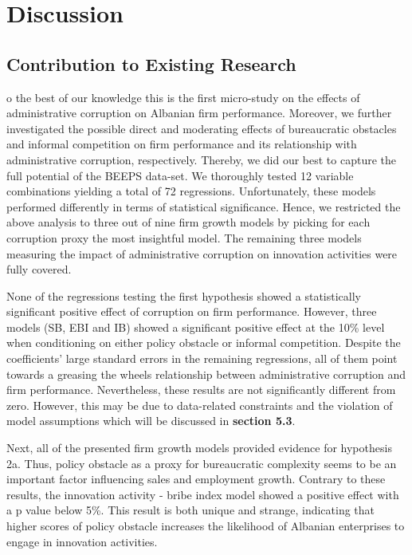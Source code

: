 %
%
\let\textcircled=\pgftextcircled
\chapter{Discussion}
\label{chap:intro}

\section{Contribution to Existing Research}
o the best of our knowledge this is the first micro-study on the effects of administrative corruption on Albanian firm performance. Moreover, we further investigated the possible direct and moderating effects of bureaucratic obstacles and informal competition on firm performance and its relationship with administrative corruption, respectively. Thereby, we did our best to capture the full potential of the BEEPS data-set. We thoroughly tested 12 variable combinations yielding a total of 72 regressions. Unfortunately, these models performed differently in terms of statistical significance. Hence, we restricted the above analysis to three out of nine firm growth models by picking for each corruption proxy the most insightful model. The remaining three models measuring the impact of administrative corruption on innovation activities were fully covered.

None of the regressions testing the first hypothesis showed a statistically significant positive effect of corruption on firm performance. However, three models (SB, EBI and IB) showed a significant positive effect at the 10\% level when conditioning on either policy obstacle or informal competition. Despite the coefficients' large standard errors in the remaining regressions, all of them point towards a greasing the wheels relationship between administrative corruption and firm performance. Nevertheless, these results are not significantly different from zero. However, this may be due to data-related constraints and the violation of model assumptions which will be discussed in \textbf{section 5.3}. 

Next, all of the presented firm growth models provided evidence for hypothesis 2a. Thus, policy obstacle as a proxy for bureaucratic complexity seems to be an important factor influencing sales and employment growth. Contrary to these results, the innovation activity - bribe index model showed a positive effect with a p value below 5\%. This result is both unique and strange, indicating that higher scores of policy obstacle increases the likelihood of Albanian enterprises to engage in innovation activities. 

